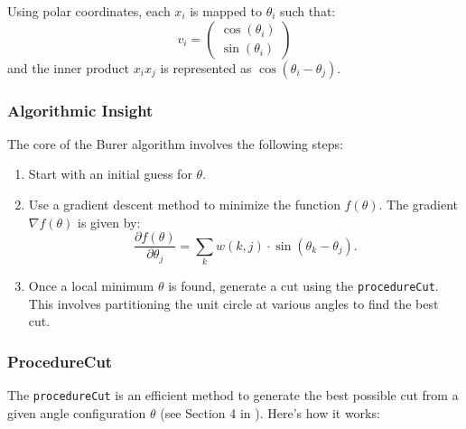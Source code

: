 Using polar coordinates, each \(x_i\) is mapped to \(\theta_i\) such that:
\[
v_i = \begin{pmatrix} \cos(\theta_i) \\ \sin(\theta_i) \end{pmatrix}
\]
and the inner product \(x_i x_j\) is represented as \(\cos(\theta_i - \theta_j)\).

\subsubsection{ Algorithmic Insight }

The core of the Burer algorithm involves the following steps:

\begin{enumerate}
    \item Start with an initial guess for \(\theta\).
    \item Use a gradient descent method to minimize the function \(f(\theta)\). The gradient \(\nabla f(\theta)\) is given by:
    \[
    \frac{\partial f(\theta)}{\partial \theta_j} = \sum_{k}  w(k, j) \cdot \sin(\theta_k - \theta_j).
    \]
    \item Once a local minimum \(\theta\) is found, generate a cut using the \texttt{procedureCut}. This involves partitioning the unit circle at various angles to find the best cut.
\end{enumerate}


\subsubsection{ ProcedureCut }
\label{burer:procedureCut}
The \texttt{procedureCut} is an efficient method to generate the best possible cut from a given angle configuration \(\theta\) (see Section 4 in \cite{burer2002rank}). Here’s how it works:


